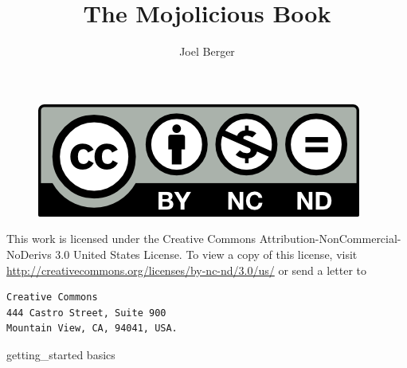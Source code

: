 \documentclass{book}
\title{The Mojolicious Book}
\author{Joel Berger}
\begin{document}
\maketitle

\newpage
\begin{figure}
  \centering
  \includegraphics{by-nc-nd}
\end{figure}
This work is licensed under the Creative Commons Attribution-NonCommercial-NoDerivs 3.0 United States License.
To view a copy of this license, visit \url{http://creativecommons.org/licenses/by-nc-nd/3.0/us/} or send a letter to
\begin{verbatim}
Creative Commons
444 Castro Street, Suite 900
Mountain View, CA, 94041, USA.
\end{verbatim}

\tableofcontents

{getting_started}
{basics}
\end{document}
